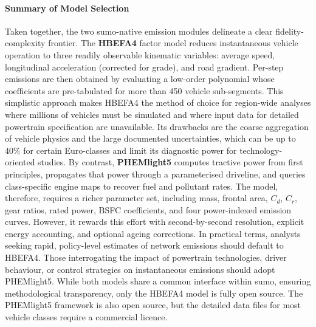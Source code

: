 \paragraph{Summary of Model Selection}  
Taken together, the two \ac{sumo}-native emission modules delineate a clear fidelity-complexity frontier. The \textbf{HBEFA4} factor model reduces instantaneous vehicle operation to three readily observable kinematic variables: average speed, longitudinal acceleration (corrected for grade), and road gradient. Per-step emissions are then obtained by evaluating a low-order polynomial whose coefficients are pre-tabulated for more than 450 vehicle sub-segments. This simplistic approach makes HBEFA4 the method of choice for region-wide analyses where millions of vehicles must be simulated and where input data for detailed powertrain specification are unavailable. Its drawbacks are the coarse aggregation of vehicle physics and the large documented uncertainties, which can be up to $40\%$ for certain Euro-classes and limit its diagnostic power for technology-oriented studies.
\mynewline
By contrast, \textbf{PHEMlight5} computes tractive power from first principles, propagates that power through a parameterised driveline, and queries class-specific engine maps to recover fuel and pollutant rates. The model, therefore, requires a richer parameter set, including mass, frontal area, $C_{d}$, $C_{r}$, gear ratios, rated power, BSFC coefficients, and four power-indexed emission curves. However, it rewards this effort with second-by-second resolution, explicit energy accounting, and optional ageing corrections.
\mynewline
In practical terms, analysts seeking rapid, policy-level estimates of network emissions should default to HBEFA4. Those interrogating the impact of powertrain technologies, driver behaviour, or control strategies on instantaneous emissions should adopt PHEMlight5. While both models share a common interface within \ac{sumo}, ensuring methodological transparency, only the HBEFA4 model is fully open source. The PHEMlight5 framework is also open source, but the detailed data files for most vehicle classes require a commercial licence.


